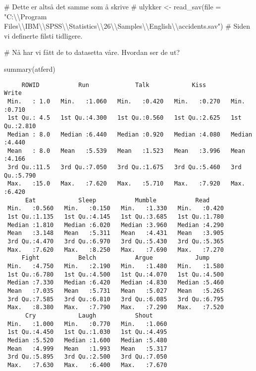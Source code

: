 \documentclass[
  letterpaper,
  DIV=11,
  numbers=noendperiod]{scrartcl}
\newenvironment{Shaded}{\begin{snugshade}}{\end{snugshade}}
\newcommand{\CommentTok}[1]{\textcolor[rgb]{0.37,0.37,0.37}{#1}}
\newcommand{\FunctionTok}[1]{\textcolor[rgb]{0.28,0.35,0.67}{#1}}
\newcommand{\NormalTok}[1]{\textcolor[rgb]{0.00,0.23,0.31}{#1}}
\begin{document}
\begin{Shaded}
\begin{Highlighting}[]
\CommentTok{\# Dette er altså det samme som å skrive }
\CommentTok{\# ulykker \textless{}{-} read\_sav(file = "C:\textbackslash{}\textbackslash{}Program Files\textbackslash{}\textbackslash{}IBM\textbackslash{}\textbackslash{}SPSS\textbackslash{}\textbackslash{}Statistics\textbackslash{}\textbackslash{}26\textbackslash{}\textbackslash{}Samples\textbackslash{}\textbackslash{}English\textbackslash{}\textbackslash{}accidents.sav")}
\CommentTok{\# Siden vi definerte filsti tidligere. }

\CommentTok{\# Nå har vi fått de to datasetta våre. Hvordan ser de ut?}

\FunctionTok{summary}\NormalTok{(atferd)}
\end{Highlighting}
\end{Shaded}

\begin{verbatim}
     ROWID           Run             Talk            Kiss           Write      
 Min.   : 1.0   Min.   :1.060   Min.   :0.420   Min.   :0.270   Min.   :0.710  
 1st Qu.: 4.5   1st Qu.:4.300   1st Qu.:0.560   1st Qu.:2.625   1st Qu.:2.810  
 Median : 8.0   Median :6.440   Median :0.920   Median :4.080   Median :4.440  
 Mean   : 8.0   Mean   :5.539   Mean   :1.523   Mean   :3.996   Mean   :4.166  
 3rd Qu.:11.5   3rd Qu.:7.050   3rd Qu.:1.675   3rd Qu.:5.460   3rd Qu.:5.790  
 Max.   :15.0   Max.   :7.620   Max.   :5.710   Max.   :7.920   Max.   :6.420  
      Eat            Sleep           Mumble           Read      
 Min.   :0.560   Min.   :0.150   Min.   :1.330   Min.   :0.420  
 1st Qu.:1.135   1st Qu.:4.145   1st Qu.:3.685   1st Qu.:1.780  
 Median :1.810   Median :6.020   Median :3.960   Median :4.290  
 Mean   :3.148   Mean   :5.311   Mean   :4.431   Mean   :3.905  
 3rd Qu.:4.470   3rd Qu.:6.970   3rd Qu.:5.430   3rd Qu.:5.365  
 Max.   :7.620   Max.   :8.250   Max.   :7.690   Max.   :7.270  
     Fight           Belch           Argue            Jump      
 Min.   :4.750   Min.   :2.190   Min.   :1.480   Min.   :1.580  
 1st Qu.:6.780   1st Qu.:4.500   1st Qu.:4.070   1st Qu.:4.500  
 Median :7.330   Median :6.420   Median :4.830   Median :5.460  
 Mean   :7.035   Mean   :5.731   Mean   :5.027   Mean   :5.265  
 3rd Qu.:7.585   3rd Qu.:6.810   3rd Qu.:6.085   3rd Qu.:6.795  
 Max.   :8.380   Max.   :7.790   Max.   :7.290   Max.   :7.520  
      Cry            Laugh           Shout      
 Min.   :1.000   Min.   :0.770   Min.   :1.060  
 1st Qu.:4.450   1st Qu.:1.030   1st Qu.:4.495  
 Median :5.520   Median :1.600   Median :5.480  
 Mean   :4.999   Mean   :1.993   Mean   :5.317  
 3rd Qu.:5.895   3rd Qu.:2.500   3rd Qu.:7.050  
 Max.   :7.630   Max.   :6.400   Max.   :7.670  
\end{verbatim}
\end{document}
